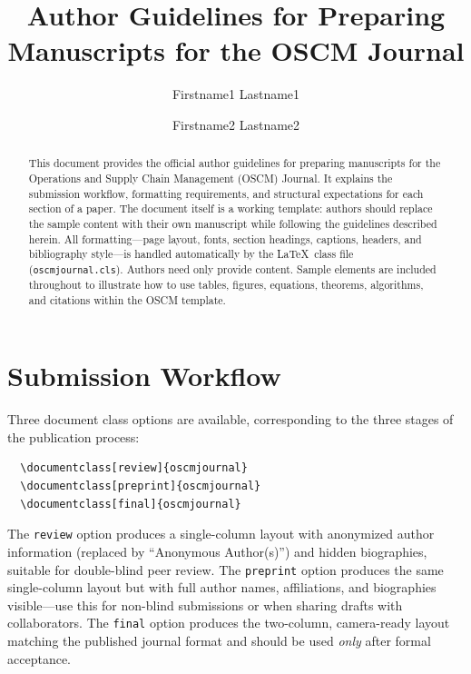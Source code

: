 \documentclass[preprint]{oscmjournal}
\title{Author Guidelines for Preparing Manuscripts for the OSCM Journal}
\author[*]{Firstname1 Lastname1}
  {Affiliation, Country}
  {oscm.help@gmail.com}
\author{Firstname2 Lastname2}
  {Affiliation, Country}
  {email@example.com}
\begin{document}

\maketitle

\begin{abstract}
This document provides the official author guidelines for preparing manuscripts for the Operations and Supply Chain Management (OSCM) Journal.
It explains the submission workflow, formatting requirements, and structural expectations for each section of a paper.
The document itself is a working template: authors should replace the sample content with their own manuscript while following the guidelines described herein.
All formatting---page layout, fonts, section headings, captions, headers, and bibliography style---is handled automatically by the \LaTeX\ class file (\texttt{oscmjournal.cls}).
Authors need only provide content.
Sample elements are included throughout to illustrate how to use tables, figures, equations, theorems, algorithms, and citations within the OSCM template.
\end{abstract}


\section{Submission Workflow}\label{sec:workflow}

Three document class options are available, corresponding to the three stages of the publication process:

\begin{verbatim}
  \documentclass[review]{oscmjournal}
  \documentclass[preprint]{oscmjournal}
  \documentclass[final]{oscmjournal}
\end{verbatim}

The \texttt{review} option produces a single-column layout with anonymized author information (replaced by ``Anonymous Author(s)'') and hidden biographies, suitable for double-blind peer review.
The \texttt{preprint} option produces the same single-column layout but with full author names, affiliations, and biographies visible---use this for non-blind submissions or when sharing drafts with collaborators.
The \texttt{final} option produces the two-column, camera-ready layout matching the published journal format and should be used \emph{only} after formal acceptance.
\end{document}
